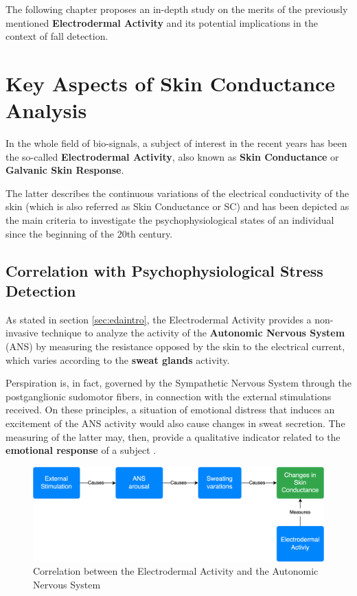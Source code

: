 \label{ch:eda-chapter}

The following chapter proposes an in-depth study on the merits of the previously mentioned \textbf{Electrodermal Activity} and its potential implications in the context of fall detection.

\section{Key Aspects of Skin Conductance Analysis}\label{sec:eda-description}

In the whole field of bio-signals, a subject of interest in the recent years has been the so-called \textbf{Electrodermal Activity}, also known as \textbf{Skin Conductance} or \textbf{Galvanic Skin Response}.

The latter describes the continuous variations of the electrical conductivity of the skin (which is also referred as Skin Conductance or SC) and has been depicted as the main criteria to investigate the psychophysiological states of an individual since the beginning of the 20th century.

\subsection{Correlation with Psychophysiological Stress Detection}\label{subsec:eda-signals}

As stated in section \ref{sec:edaintro}, the Electrodermal Activity provides a non-invasive technique to analyze the activity of the \textbf{Autonomic Nervous System} (ANS) by measuring the resistance opposed by the skin to the electrical current, which varies according to the \textbf{sweat glands} activity.

Perspiration is, in fact, governed by the Sympathetic Nervous System \cite{bartholomew} through the postganglionic sudomotor fibers, in connection with the external stimulations received. On these principles, a situation of emotional distress that induces an excitement of the ANS activity would also cause changes in sweat secretion. The measuring of the latter may, then, provide a qualitative indicator related to the \textbf{emotional response} of a subject \cite{carlson}.

\begin{figure}[h]
    \centering
    \includegraphics[width=\textwidth]{./images/eda-cause-effect.drawio.png}
    \caption{Correlation between the Electrodermal Activity and the Autonomic Nervous System}
    \label{fig:eda-ans}
\end{figure}

